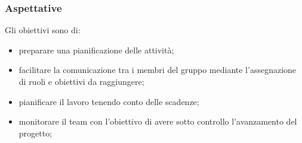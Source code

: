 \subsubsection{Aspettative} Gli obiettivi sono di:
\begin{itemize}
	\item{preparare una pianificazione delle attività;}
	\item{facilitare la comunicazione tra i membri del gruppo mediante l'assegnazione di ruoli e obiettivi da raggiungere;}
	\item{pianificare il lavoro tenendo conto delle scadenze;}
	\item{monitorare il team con l'obiettivo di avere sotto controllo l'avanzamento del progetto;}
\end{itemize}